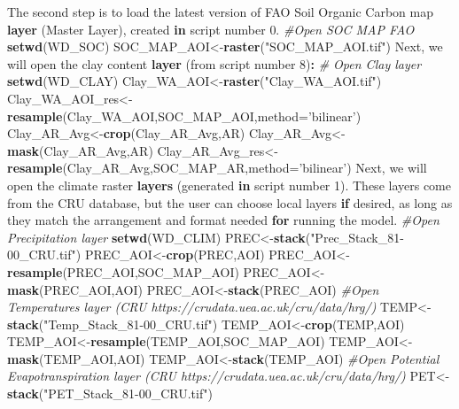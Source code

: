 \documentclass[
  10pt,
  b5paper,
]{book}
\newenvironment{Shaded}{\begin{snugshade}}{\end{snugshade}}
\newcommand{\CommentTok}[1]{\textcolor[rgb]{0.56,0.35,0.01}{\textit{#1}}}
\newcommand{\ControlFlowTok}[1]{\textcolor[rgb]{0.13,0.29,0.53}{\textbf{#1}}}
\newcommand{\DataTypeTok}[1]{\textcolor[rgb]{0.13,0.29,0.53}{#1}}
\newcommand{\DecValTok}[1]{\textcolor[rgb]{0.00,0.00,0.81}{#1}}
\newcommand{\FloatTok}[1]{\textcolor[rgb]{0.00,0.00,0.81}{#1}}
\newcommand{\KeywordTok}[1]{\textcolor[rgb]{0.13,0.29,0.53}{\textbf{#1}}}
\newcommand{\NormalTok}[1]{#1}
\newcommand{\OperatorTok}[1]{\textcolor[rgb]{0.81,0.36,0.00}{\textbf{#1}}}
\newcommand{\StringTok}[1]{\textcolor[rgb]{0.31,0.60,0.02}{#1}}
\begin{document}
\begin{Shaded}
\begin{Highlighting}[]
\NormalTok{The second step is to load the latest version of FAO Soil Organic Carbon map }\KeywordTok{layer}\NormalTok{ (Master Layer), created }\ControlFlowTok{in}\NormalTok{ script number }\FloatTok{0.} 
\CommentTok{#Open SOC MAP FAO}
\KeywordTok{setwd}\NormalTok{(WD_SOC)}
\NormalTok{SOC_MAP_AOI<-}\KeywordTok{raster}\NormalTok{(}\StringTok{"SOC_MAP_AOI.tif"}\NormalTok{)}
\NormalTok{ Next, we will open the clay content }\KeywordTok{layer}\NormalTok{ (from script number }\DecValTok{8}\NormalTok{)}\OperatorTok{:}
\CommentTok{# Open Clay layer}
\KeywordTok{setwd}\NormalTok{(WD_CLAY)}
\NormalTok{Clay_WA_AOI<-}\KeywordTok{raster}\NormalTok{(}\StringTok{"Clay_WA_AOI.tif"}\NormalTok{)}
\NormalTok{Clay_WA_AOI_res<-}\KeywordTok{resample}\NormalTok{(Clay_WA_AOI,SOC_MAP_AOI,}\DataTypeTok{method=}\StringTok{'bilinear'}\NormalTok{) }
\NormalTok{Clay_AR_Avg<-}\KeywordTok{crop}\NormalTok{(Clay_AR_Avg,AR)}
\NormalTok{Clay_AR_Avg<-}\KeywordTok{mask}\NormalTok{(Clay_AR_Avg,AR)}
\NormalTok{Clay_AR_Avg_res<-}\KeywordTok{resample}\NormalTok{(Clay_AR_Avg,SOC_MAP_AR,}\DataTypeTok{method=}\StringTok{'bilinear'}\NormalTok{) }
\NormalTok{Next, we will open the climate raster }\KeywordTok{layers}\NormalTok{ (generated }\ControlFlowTok{in}\NormalTok{ script number }\DecValTok{1}\NormalTok{).  These layers come from the CRU database, but the user can choose local layers }\ControlFlowTok{if}\NormalTok{ desired, as long as they match the arrangement and format needed }\ControlFlowTok{for}\NormalTok{ running the model.}
\CommentTok{#Open Precipitation layer }
\KeywordTok{setwd}\NormalTok{(WD_CLIM)}
\NormalTok{PREC<-}\KeywordTok{stack}\NormalTok{(}\StringTok{"Prec_Stack_81-00_CRU.tif"}\NormalTok{)}
\NormalTok{PREC_AOI<-}\KeywordTok{crop}\NormalTok{(PREC,AOI)}
\NormalTok{PREC_AOI<-}\KeywordTok{resample}\NormalTok{(PREC_AOI,SOC_MAP_AOI)}
\NormalTok{PREC_AOI<-}\KeywordTok{mask}\NormalTok{(PREC_AOI,AOI)}
\NormalTok{PREC_AOI<-}\KeywordTok{stack}\NormalTok{(PREC_AOI)}
\CommentTok{#Open Temperatures layer (CRU https://crudata.uea.ac.uk/cru/data/hrg/)}
\NormalTok{TEMP<-}\KeywordTok{stack}\NormalTok{(}\StringTok{"Temp_Stack_81-00_CRU.tif"}\NormalTok{)}
\NormalTok{TEMP_AOI<-}\KeywordTok{crop}\NormalTok{(TEMP,AOI)}
\NormalTok{TEMP_AOI<-}\KeywordTok{resample}\NormalTok{(TEMP_AOI,SOC_MAP_AOI)}
\NormalTok{TEMP_AOI<-}\KeywordTok{mask}\NormalTok{(TEMP_AOI,AOI)}
\NormalTok{TEMP_AOI<-}\KeywordTok{stack}\NormalTok{(TEMP_AOI)}
\CommentTok{#Open Potential Evapotranspiration layer (CRU https://crudata.uea.ac.uk/cru/data/hrg/)}
\NormalTok{PET<-}\KeywordTok{stack}\NormalTok{(}\StringTok{"PET_Stack_81-00_CRU.tif"}\NormalTok{)}

\end{Highlighting}
\end{Shaded}
\end{document}
